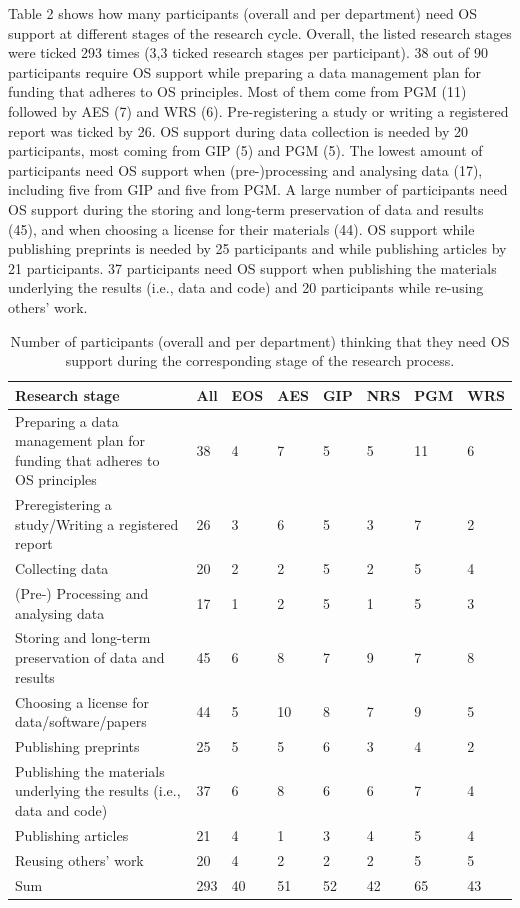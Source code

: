 \documentclass[gc, manuscript]{copernicus}
\begin{document}
Table 2 shows how many participants (overall and per department) need OS
support at different stages of the research cycle. Overall, the listed
research stages were ticked 293 times (3,3 ticked research stages per
participant). 38 out of 90 participants require OS support while
preparing a data management plan for funding that adheres to OS
principles. Most of them come from PGM (11) followed by AES (7) and WRS
(6). Pre-registering a study or writing a registered report was ticked
by 26. OS support during data collection is needed by 20 participants,
most coming from GIP (5) and PGM (5). The lowest amount of participants
need OS support when (pre-)processing and analysing data (17), including
five from GIP and five from PGM. A large number of participants need OS
support during the storing and long-term preservation of data and
results (45), and when choosing a license for their materials (44). OS
support while publishing preprints is needed by 25 participants and
while publishing articles by 21 participants. 37 participants need OS
support when publishing the materials underlying the results (i.e., data
and code) and 20 participants while re-using others' work.

\begin{table}
\caption{Number of participants (overall and per department) thinking that they need OS support during the corresponding stage of the research process.}
\begin{tabular}{p{9cm} | p{0.6cm} | p{0.6cm} | p{0.6cm} | p{0.6cm} | p{0.6cm} | p{0.6cm} | p{0.6cm}} 
\textbf{Research stage} & \textbf{All} & \textbf{EOS} & \textbf{AES} & \textbf{GIP} & \textbf{NRS} & \textbf{PGM} & \textbf{WRS} \\
  \hline 
  Preparing a data management plan for funding that adheres to OS principles &  38 & 4 & 7 & 5 & 5 & 11 & 6 \\ 
  \hline
  Preregistering a study/Writing a registered report & 26 & 3 & 6 & 5 & 3 & 7 & 2 \\ 
  \hline
  Collecting data & 20 & 2 & 2 & 5 & 2 & 5 & 4 \\ 
  \hline
  (Pre-) Processing and analysing data & 17 & 1 & 2 & 5 & 1 & 5 & 3 \\
  \hline
  Storing and long-term preservation of data and results & 45 & 6 & 8 & 7 & 9 & 7 & 8 \\
  \hline
  Choosing a license for data/software/papers & 44 & 5 & 10 & 8 & 7 & 9 & 5 \\
  \hline
  Publishing preprints & 25 & 5 & 5 & 6 & 3 & 4 & 2 \\
  \hline
  Publishing the materials underlying the results (i.e., data and code) & 37 & 6 & 8 & 6 & 6 & 7 & 4 \\
  \hline
  Publishing articles & 21 & 4 & 1 & 3 & 4 & 5 & 4 \\
  \hline
  Reusing others’ work & 20 & 4 & 2 & 2 & 2 & 5 & 5 \\
  \hline
  Sum & 293 & 40 & 51 & 52 & 42 & 65 & 43 \\
  \hline
\end{tabular}
\label{table:2}
\end{table}
\end{document}
